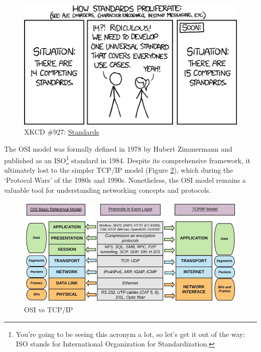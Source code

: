 \vspace{1em}
\begin{figure}[h]
    \centering
    \includegraphics[width=.6\textwidth]{assets/osi/physical/standards.png}
    \caption{XKCD \#927: \href{https://xkcd.com/927/}{Standards}}
    \label{fig:standards}
\end{figure}

The OSI model was formally defined in 1978 by Hubert Zimmermann and published as an ISO\footnote{
    You're going to be seeing this acronym a lot, so let's get it out of the way: ISO stands for International Organization for Standardization.
} standard in 1984. Despite its comprehensive framework, it ultimately lost to the simpler TCP/IP model (Figure \ref{fig:osi_vs_tcpip}), which during the `Protocol Wars' of the 1980s and 1990s. Nonetheless, the OSI model remains a valuable tool for understanding networking concepts and protocols.

\begin{figure}[h]
    \centering
    \includegraphics[width=.7\textwidth]{assets/osi/physical/tcp_vs_osi.png}
    \caption{OSI vs TCP/IP}
    \label{fig:osi_vs_tcpip}
\end{figure}






